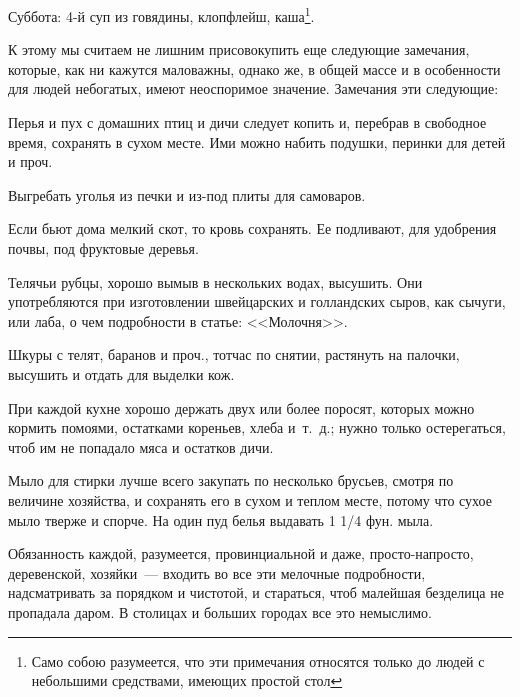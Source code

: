 Суббота: 4-й суп из говядины, клопфлейш, каша\footnote{Само собою разумеется, что эти примечания относятся только до людей с небольшими средствами, имеющих простой стол}.

К этому мы считаем не лишним присовокупить еще следующие замечания, которые, как ни кажутся маловажны, однако же, в общей массе и в особенности для людей небогатых, имеют неоспоримое значение. Замечания эти следующие:

Перья и пух с домашних птиц и дичи следует копить и, перебрав в свободное время, сохранять в сухом месте. Ими можно набить подушки, перинки для детей и проч.

Выгребать уголья из печки и из-под плиты для самоваров.

Если бьют дома мелкий скот, то кровь сохранять. Ее подливают, для удобрения почвы, под фруктовые деревья.

Телячьи рубцы, хорошо вымыв в нескольких водах, высушить. Они употребляются при изготовлении швейцарских и голландских сыров, как сычуги, или лаба, о чем подробности в статье: <<Молочня>>.

Шкуры с телят, баранов и проч., тотчас по снятии, растянуть на палочки, высушить и отдать для выделки кож.

При каждой кухне хорошо держать двух или более поросят, которых можно кормить помоями, остатками кореньев, хлеба и~т.~д.; нужно только остерегаться, чтоб им не попадало мяса и остатков дичи.

Мыло для стирки лучше всего закупать по несколько брусьев, смотря по величине хозяйства, и сохранять его в сухом и теплом месте, потому что сухое мыло тверже и спорче. На один пуд белья выдавать 1 1/4 фун. мыла.

Обязанность каждой, разумеется, провинциальной и даже, просто-напросто, деревенской, хозяйки~--- входить во все эти мелочные подробности, надсматривать за порядком и чистотой, и стараться, чтоб малейшая безделица не пропадала даром. В столицах и больших городах все это немыслимо.

